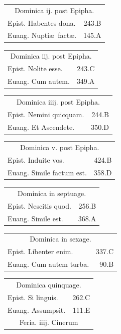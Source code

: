 \documentclass[a5paper,10pt]{book}
\def\ae{æ}
\begin{document}
\begin{multicols}{2}
\begin{tabular}{l r}
\multicolumn{2}{c}{\color{red} Dominica ij. post Epipha.}\\
Epist. Habentes dona. & 243.B\\
Euang. Nupti\ae \ fact\ae . & 145.A\\
\end{tabular}
\begin{tabular}{l r}
\multicolumn{2}{c}{\color{red} Dominica iij. post Epipha.}\\
Epist. Nolite esse. & 243.C\\
Euang. Cum autem. & 349.A\\
\end{tabular}
\begin{tabular}{l r}
\multicolumn{2}{c}{\color{red} Dominica iiij. post Epipha.}\\
Epist. Nemini quicquam. & 244.B\\%
Euang. Et Ascendete. & 350.D\\
\end{tabular}
\begin{tabular}{l r}
\multicolumn{2}{c}{\color{red} Dominica v. post Epipha.}\\
Epist. Induite vos. & 424.B\\
Euang. Simile factum est. & 358.D\\
\end{tabular}
\begin{tabular}{l r}
\multicolumn{2}{c}{\color{red} Dominica in septuage.}\\
Epist. Nescitis quod. & 256.B\\
Euang. Simile est. & 368.A\\
\end{tabular}
\begin{tabular}{l r}
\multicolumn{2}{c}{\color{red} Dominica in sexage.}\\
Epist. Libenter enim. & 337.C\\
Euang. Cum autem turba. & 90.B\\
\end{tabular}
\begin{tabular}{l r}
\multicolumn{2}{c}{\color{red} Dominica quinquage.}\\
Epist. Si linguis. & 262.C\\
Euang. Assumpsit. & 111.E\\
\multicolumn{2}{c}{\color{red} Feria. iiij. Cinerum}\\

\end{tabular}
\end{multicols}
\end{document}
